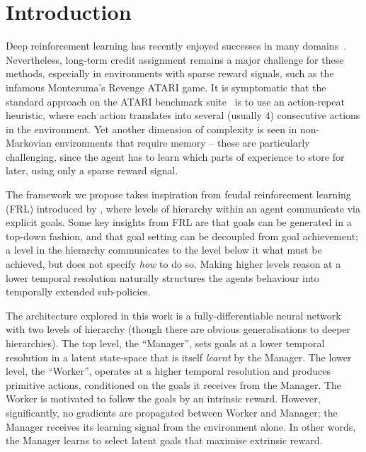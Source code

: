\seckiny
\section{Introduction}
\seckiny

Deep reinforcement learning has recently enjoyed successes in many domains~\cite{mnih-dqn-2015,schulman2015trust,levine2015endtoend,mnih2016asynchronous,lillicrap2015continuous}. 
%
Nevertheless, long-term credit assignment remains a major challenge for these methods, especially in environments with sparse reward signals, such as the infamous Montezuma's Revenge ATARI game. 
It is symptomatic that the standard approach on the ATARI benchmark suite~\cite{bellemare-ale} is to use an action-repeat heuristic, where each action translates into several (usually $4$) consecutive actions in the environment. 
Yet another dimension of complexity is seen in non-Markovian environments that require memory -- these are particularly challenging, since the agent has to learn which parts of experience to store for later, using only a sparse reward signal. 


The framework we propose takes inspiration from feudal reinforcement learning (FRL) introduced by \citet{dayan1993feudal}, where levels of hierarchy within an agent communicate via explicit goals. 
Some key insights from FRL are that goals can be generated in a top-down fashion, and that goal setting can be decoupled from  goal achievement; a level in the hierarchy communicates to the level below it what must be achieved, but does not specify \emph{how} to do so.  Making higher levels reason at a lower temporal resolution naturally structures the agents behaviour into temporally extended sub-policies.  

The architecture explored in this work is a fully-differentiable neural network with two levels of hierarchy (though there are obvious generalisations to deeper hierarchies).
The top level, the “Manager”, sets goals at a lower temporal resolution in a latent state-space that is itself \textit{learnt} by the Manager.
The lower level, the “Worker”, operates at a higher temporal resolution and produces primitive actions, conditioned on the goals it receives from the Manager. The Worker is motivated to follow the goals by an intrinsic reward.
However, significantly, no gradients are propagated between Worker and Manager; the Manager receives its learning signal from the environment alone. In other words, the Manager learns to select latent goals that maximise extrinsic reward.

